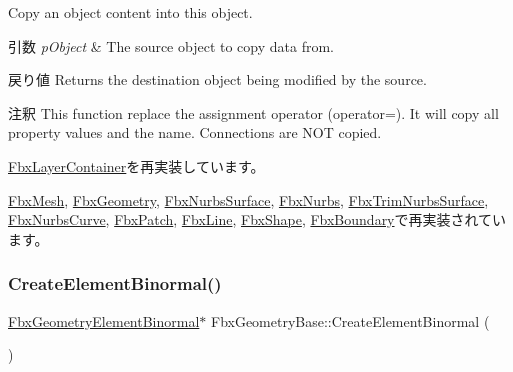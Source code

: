 Copy an object content into this object. 
\begin{DoxyParams}{引数}
{\em p\+Object} & The source object to copy data from. \\
\hline
\end{DoxyParams}
\begin{DoxyReturn}{戻り値}
Returns the destination object being modified by the source. 
\end{DoxyReturn}
\begin{DoxyRemark}{注釈}
This function replace the assignment operator (operator=). It will copy all property values and the name. Connections are N\+OT copied. 
\end{DoxyRemark}


\hyperlink{class_fbx_layer_container_abb8c7ba2b201b4e4ff39b2c8db144769}{Fbx\+Layer\+Container}を再実装しています。



\hyperlink{class_fbx_mesh_a0f041743536ee5ccbc9a086e3ef1c663}{Fbx\+Mesh}, \hyperlink{class_fbx_geometry_aac1cee4251e3d5fbd27f1181c58b83b3}{Fbx\+Geometry}, \hyperlink{class_fbx_nurbs_surface_a1da47f75af4920a3fb4a94690d8ada8c}{Fbx\+Nurbs\+Surface}, \hyperlink{class_fbx_nurbs_ac7c9a9018b4fdbe72b258a2fa0a3367d}{Fbx\+Nurbs}, \hyperlink{class_fbx_trim_nurbs_surface_a4407d30e83346ab3cb30ccf67d7bb289}{Fbx\+Trim\+Nurbs\+Surface}, \hyperlink{class_fbx_nurbs_curve_ad48046242c0a63d929b5440563668f79}{Fbx\+Nurbs\+Curve}, \hyperlink{class_fbx_patch_a424542a42ec75d3c5236cc366adecd89}{Fbx\+Patch}, \hyperlink{class_fbx_line_aeb9e0c53cf02d3e4e206b25c87c06256}{Fbx\+Line}, \hyperlink{class_fbx_shape_ab9776a1c0ce41830bc6841ebba4c4a23}{Fbx\+Shape}, \hyperlink{class_fbx_boundary_a6fe59f45c17eeebbabaeff235058ac70}{Fbx\+Boundary}で再実装されています。

\mbox{\label{class_fbx_geometry_base_aaac14a98782b9f68803462f033297d05}} 
\subsubsection{\texorpdfstring{Create\+Element\+Binormal()}{CreateElementBinormal()}}
{\footnotesize\ttfamily \hyperlink{fbxlayer_8h_a066e30a64eb051458583b656a651e90b}{Fbx\+Geometry\+Element\+Binormal}$\ast$ Fbx\+Geometry\+Base\+::\+Create\+Element\+Binormal (\begin{DoxyParamCaption}{ }\end{DoxyParamCaption})}

